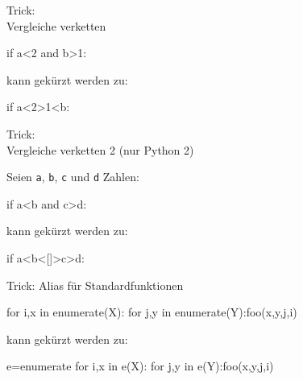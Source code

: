 \documentclass[xcolor=dvipsnames, aspectratio=43, 14pt]{beamer}
\begin{document}
\begin{frame}[fragile]{Trick:\\ Vergleiche verketten}
	\begin{python3code}
	if a<2 and b>1:
	\end{python3code}
	
	\vfill
	
	kann gekürzt werden zu:
	
	\vfill
	
	\begin{python3code}
	if a<2>1<b:
	\end{python3code}
\end{frame}

\begin{frame}[fragile]{Trick:\\ Vergleiche verketten 2}
	(nur Python 2)
	
	\vfill
	
	Seien \texttt{a}, \texttt{b}, \texttt{c} und \texttt{d} Zahlen:
	
	\vfill
	
	\begin{python3code}
	if a<b and c>d:
	\end{python3code}
	
	\vfill
	
	kann gekürzt werden zu:
	
	\vfill
	
	\begin{python3code}
	if a<b<[]>c>d:
	\end{python3code}
\end{frame}


\begin{frame}[fragile]{Trick: Alias für Standardfunktionen}
	\begin{python3code}
	for i,x in enumerate(X):
	   for j,y in enumerate(Y):foo(x,y,j,i)
	\end{python3code}
	
	\vfill
	
	kann gekürzt werden zu:
	
	\vfill
	
	\begin{python3code}
	e=enumerate
	for i,x in e(X):
	   for j,y in e(Y):foo(x,y,j,i)
	\end{python3code}
\end{frame}
\end{document}
